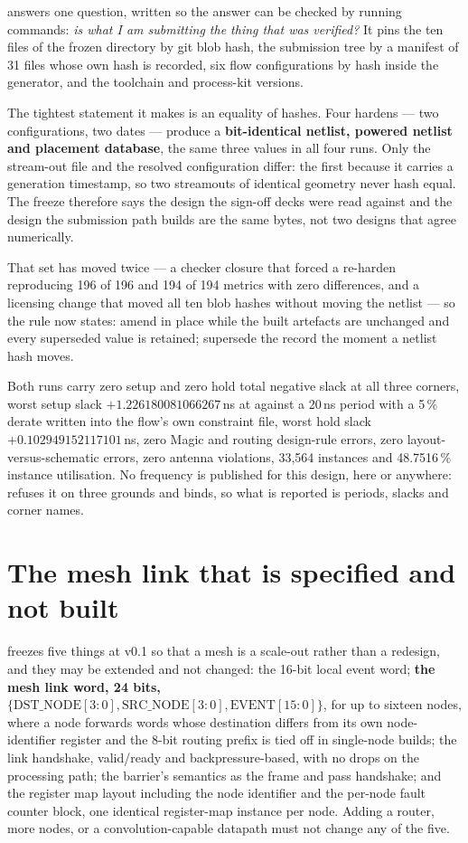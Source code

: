  answers one question, written so the answer can be checked
by running commands: \emph{is what I am submitting the thing that was
verified?} It pins the ten files of the frozen directory by git blob
hash, the submission tree by a manifest of 31 files whose own hash is
recorded, six flow configurations by hash inside the generator, and the
toolchain and process-kit versions.

The tightest statement it makes is an equality of hashes. Four hardens
--- two configurations, two dates --- produce a \textbf{bit-identical
netlist, powered netlist and placement database}, the same three values
in all four runs. Only the stream-out file and the resolved
configuration differ: the first because it carries a generation
timestamp, so two streamouts of identical geometry never hash equal.
The freeze therefore says the design the sign-off decks were read
against and the design the submission path builds are the same bytes,
not two designs that agree numerically.

That set has moved twice --- a checker closure that forced a re-harden
reproducing 196 of 196 and 194 of 194 metrics with zero differences,
and a licensing change that moved all ten blob hashes without moving
the netlist --- so the rule now states: amend in place while the built
artefacts are unchanged and every superseded value is retained;
supersede the record the moment a netlist hash moves.

Both runs carry zero setup and zero hold total negative slack at all
three corners, worst setup slack $+1.226180081066267$\,ns at
 against a 20\,ns period with a 5\,\%
derate written into the flow's own constraint file, worst hold slack
$+0.102949152117101$\,ns, zero Magic and routing design-rule errors,
zero layout-versus-schematic errors, zero antenna violations, 33,564
instances and 48.7516\,\% instance utilisation. No frequency is
published for this design, here or anywhere:  refuses it on
three grounds and  binds, so what is reported is
periods, slacks and corner names.

\section{The mesh link that is specified and not built}

 freezes five things at v0.1 so that a mesh is a
scale-out rather than a redesign, and they may be extended and not
changed: the 16-bit local event word; \textbf{the mesh link word, 24
bits, $\{\mathrm{DST\_NODE}[3{:}0], \mathrm{SRC\_NODE}[3{:}0],
\mathrm{EVENT}[15{:}0]\}$}, for up to sixteen nodes, where a node
forwards words whose destination differs from its own node-identifier
register and the 8-bit routing prefix is tied off in single-node
builds; the link handshake, valid/ready and backpressure-based, with no
drops on the processing path; the barrier's semantics as the frame and
pass handshake; and the register map layout including the node
identifier and the per-node fault counter block, one identical
register-map instance per node. Adding a router, more nodes, or a
convolution-capable datapath must not change any of the five.

